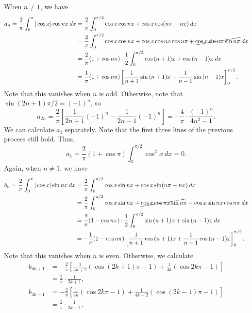 \documentclass[10pt]{article}
\begin{document}
        When $n \neq 1$, we have
        \begin{align*}
                a_n = \frac{2}{\pi}\int_0^\pi |\cos{x}|\cos{nx}\:dx &= \frac{2}{\pi}\int_0^{\pi/2} \cos{x}\cos{nx} + \cos{x}\cos( n\pi - nx )\:dx \\
                        &= \frac{2}{\pi}\int_0^{\pi/2}\cos{x}\cos{nx} + \cos{x}\cos{nx}\cos{n\pi} + \cancel{\cos{x}\sin{nx}\sin{n\pi}}\:dx \\
                        &= \frac{2}{\pi}(1 + \cos{n\pi}) \cdot\frac{1}{2}\int_0^{\pi/2} \cos{(n + 1)x} + \cos{(n - 1)x}\:dx \\
                        &= \frac{1}{\pi}(1 + \cos{n\pi}) \left[ \frac{1}{n + 1}\sin{(n + 1)x} + 
                                \frac{1}{n - 1}\sin{(n - 1)x} \right]_0^{\pi /2}.
        \end{align*}
        Note that this vanishes when $n$ is odd. Otherwise, note that $\sin{(2n + 1)\pi /2} = (-1)^n$, so
        \[
                a_{2n} = \frac{2}{\pi}\left[\frac{1}{2n + 1}(-1)^n - \frac{1}{2n - 1}(-1)^n\right] = -\frac{4}{\pi}\cdot\frac{(-1)^n}{4n^2 - 1}.
        \]
        We can calculate $a_1$ separately. Note that the first three lines of the previous process still hold. Thus,
        \[
                a_1 = \frac{2}{\pi}(1 + \cos{\pi})\int_0^{\pi/2} \cos^2{x}\:dx = 0.
        \]
        Again, when $n \neq 1$, we have
        \begin{align*}
                b_n = \frac{2}{\pi}\int_0^\pi |\cos{x}|\sin{nx}\:dx &= \frac{2}{\pi}\int_0^{\pi/2} \cos{x}\sin{nx} + \cos{x}\sin( n\pi - nx )\:dx \\
                        &= \frac{2}{\pi}\int_0^{\pi/2}\cos{x}\sin{nx} + \cancel{\cos{x}\cos{nx}\sin{n\pi}} - \cos{x}\sin{nx}\cos{n\pi}\:dx \\
                        &= \frac{2}{\pi}(1 - \cos{n\pi}) \cdot\frac{1}{2}\int_0^{\pi/2} \sin{(n + 1)x} + \sin{(n - 1)x}\:dx \\
                        &= -\frac{1}{\pi}(1 - \cos{n\pi}) \left[ \frac{1}{n + 1}\cos{(n + 1)x} + 
                                \frac{1}{n - 1}\cos{(n - 1)x} \right]_0^{\pi /2}.
        \end{align*}
        Note that this vanishes when $n$ is even.
        Otherwise, we calculate
        \begin{align*}
                b_{4k + 1} &= -\frac{2}{\pi}\left[\frac{1}{4k + 2}(\cos{(2k + 1)\pi} - 1) + \frac{1}{4k}(\cos{2k\pi} - 1)\right] \\
                        &= \frac{2}{\pi}\cdot \frac{1}{2k + 1}, \\
                b_{4k - 1} &= -\frac{2}{\pi}\left[\frac{1}{4k}(\cos{2k\pi} - 1) + \frac{1}{4k - 2}(\cos{(2k - 1)\pi} - 1)\right] \\
                        &= \frac{2}{\pi}\cdot \frac{1}{2k - 1}.
        \end{align*}
\end{document}
